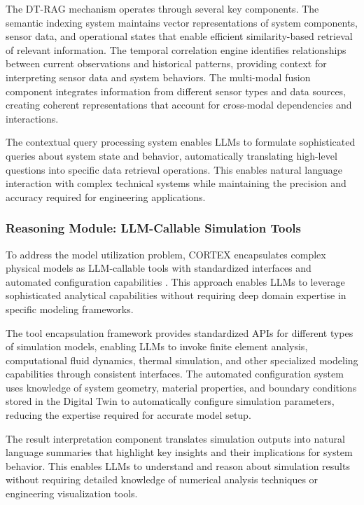 The DT-RAG mechanism operates through several key components. The semantic indexing system maintains vector representations of system components, sensor data, and operational states that enable efficient similarity-based retrieval of relevant information. The temporal correlation engine identifies relationships between current observations and historical patterns, providing context for interpreting sensor data and system behaviors. The multi-modal fusion component integrates information from different sensor types and data sources, creating coherent representations that account for cross-modal dependencies and interactions.

The contextual query processing system enables LLMs to formulate sophisticated queries about system state and behavior, automatically translating high-level questions into specific data retrieval operations. This enables natural language interaction with complex technical systems while maintaining the precision and accuracy required for engineering applications.

\subsubsection{Reasoning Module: LLM-Callable Simulation Tools}

To address the model utilization problem, CORTEX encapsulates complex physical models as LLM-callable tools with standardized interfaces and automated configuration capabilities \cite{schick2023toolformer, qin2023toolllm}. This approach enables LLMs to leverage sophisticated analytical capabilities without requiring deep domain expertise in specific modeling frameworks.

The tool encapsulation framework provides standardized APIs for different types of simulation models, enabling LLMs to invoke finite element analysis, computational fluid dynamics, thermal simulation, and other specialized modeling capabilities through consistent interfaces. The automated configuration system uses knowledge of system geometry, material properties, and boundary conditions stored in the Digital Twin to automatically configure simulation parameters, reducing the expertise required for accurate model setup.

The result interpretation component translates simulation outputs into natural language summaries that highlight key insights and their implications for system behavior. This enables LLMs to understand and reason about simulation results without requiring detailed knowledge of numerical analysis techniques or engineering visualization tools.


